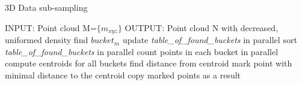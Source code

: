 \documentclass{article}
\begin{document}
\begin{algorithm}
\caption{3D Data sub-sampling}
\begin{algorithmic}
\label{algorithm:sparse}
\STATE INPUT: Point cloud M=$\{m_{xyz}\}$
\STATE OUTPUT: Point cloud N with decreased, uniformed density
  \STATE find $bucket_m$
  \STATE update \textit{table\_of\_found\_buckets}
\ENDFOR
\STATE in parallel sort \textit{table\_of\_found\_buckets} 
\STATE in parallel count points in each bucket
\STATE in parallel compute centroids for all buckets
  \STATE find distance from centroid
 \ENDFOR
 \STATE mark point with minimal distance to the centroid
\ENDFOR
\STATE copy marked points as a result
\end{algorithmic}
\end{algorithm}
\end{document}
